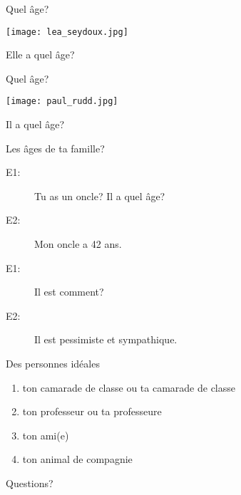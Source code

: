 \documentclass{beamer}
\begin{document}
  \begin{frame}{Quel âge?}
    \begin{center}
      \texttt{[image: lea\_seydoux.jpg]}

      Elle a quel âge? \underline{}
    \end{center}
  \end{frame}

  \begin{frame}{Quel âge?}
    \begin{center}
      \texttt{[image: paul\_rudd.jpg]}

      Il a quel âge? \underline{}
    \end{center}
  \end{frame}

  \begin{frame}{Les âges de ta famille?}
    \begin{description}
      \item[E1:] Tu as un oncle? Il a quel âge?
      \item[E2:] Mon oncle a 42 ans.
      \item[E1:] Il est comment?
      \item[E2:] Il est pessimiste et sympathique.
    \end{description}
  \end{frame}

  \begin{frame}{Des personnes idéales}
    \begin{enumerate}
      \item ton camarade de classe ou ta camarade de classe
      \item ton professeur ou ta professeure
      \item ton ami(e)
      \item ton animal de compagnie
    \end{enumerate}
  \end{frame}

  \begin{frame}{}
    \begin{center}
      \Large Questions?
    \end{center}
  \end{frame}
\end{document}
